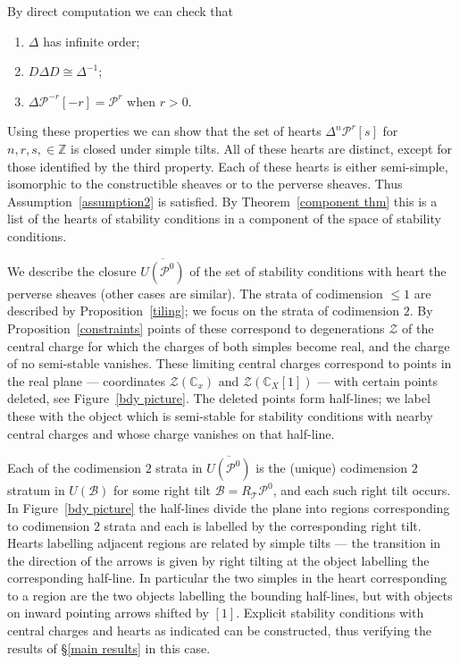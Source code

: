 \documentclass{article}
\theoremstyle{plain}
\theoremstyle{definition}
\theoremstyle{remark}
\newcommand{\Z}{\mathbb{Z}}
\newcommand{\C}{\mathbb{C}}
\newcommand{\cat}[1]{\mathcal{#1}}
\newcommand{\perv}[3]{\cat{P}^{#1}_{#3}{[#2]}}
\begin{document}
By direct computation we can check that
\begin{enumerate}
\item $\Delta$ has infinite order;
\item $D\Delta D \cong \Delta^{-1}$;
\item $\Delta\perv{-r}{-r}{} = \cat{P}^{r}$ when $r>0$.
\end{enumerate}
Using these properties we can show that the set of hearts $ \Delta^n\perv{r}{s}{}$ for $n,r,s, \in \Z$ is closed under simple tilts. All of these hearts are distinct, except for those identified by the third property.  Each of these hearts is either semi-simple, isomorphic to the constructible sheaves or to the perverse sheaves. Thus Assumption~\ref{assumption2} is satisfied. By Theorem~\ref{component thm} this is a list of the hearts of stability conditions in a component of the space of stability conditions.







\label{diagram explanation}
We describe the closure $\overline{U(\cat{P}^0)}$ of the set of stability conditions with heart the perverse sheaves (other cases are similar). The strata of codimension $\leq 1$ are described by Proposition~\ref{tiling};  we focus on the strata of codimension $2$. By Proposition~\ref{constraints} points of these correspond to degenerations $\mathcal{Z}$ of the central charge for which the charges of both simples become real, and the charge of no semi-stable vanishes. These limiting central charges correspond to points in the real plane --- coordinates $\mathcal{Z}(\C_x)$ and $\mathcal{Z}(\C_X[1])$ --- with certain points deleted, see Figure~\ref{bdy picture}. The deleted points form half-lines; we label these with the object which is semi-stable for stability conditions with nearby central charges and whose charge vanishes on that half-line. 

Each of the codimension $2$ strata in $\overline{U(\cat{P}^0)}$ is the (unique) codimension $2$ stratum in $U(\cat{B})$ for some right tilt $\cat{B}=R_\cat{T}\cat{P}^0$, and each such right tilt occurs. In Figure~\ref{bdy picture} the half-lines divide the plane into regions corresponding to codimension $2$ strata and each is labelled by the corresponding right tilt. Hearts labelling adjacent regions are related by simple tilts --- the transition in the direction of the arrows is given by right tilting at the object labelling the corresponding half-line. In particular the two simples in the heart corresponding to a region are the two objects labelling the bounding half-lines, but with objects on inward pointing arrows shifted by $[1]$. Explicit stability conditions with central charges and hearts as indicated can be constructed, thus verifying the results of \S\ref{main results} in this case. 
\end{document}
